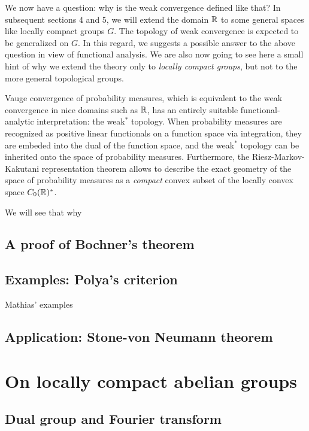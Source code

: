 \documentclass[12pt]{article}
\begin{document}
We now have a question: why is the weak convergence defined like that?
In subsequent sections 4 and 5, we will extend the domain $\mathbb{R}$ to some general spaces like locally compact groups $G$.
The topology of weak convergence is expected to be generalized on $G$.
In this regard, we suggests a possible answer to the above question in view of functional analysis.
We are also now going to see here a small hint of why we extend the theory only to \emph{locally compact groups}, but not to the more general topological groups.

Vauge convergence of probability measures, which is equivalent to the weak convergence in nice domains such as $\mathbb{R}$, has an entirely suitable functional-analytic interpretation: the weak$^*$ topology.
When probability measures are recognized as positive linear functionals on a function space via integration, they are embeded into the dual of the function space, and the weak$^*$ topology can be inherited onto the space of probability measures.
Furthermore, the Riesz-Markov-Kakutani representation theorem allows to describe the exact geometry of the space of probability measures as a \emph{compact} convex subset of the locally convex space $C_0(\mathbb{R})^*$.

We will see that why 



\subsection{A proof of Bochner's theorem}


\subsection{Examples: Polya's criterion}
Mathias' examples

\subsection{Application: Stone-von Neumann theorem}






\section{On locally compact abelian groups}

\subsection{Dual group and Fourier transform}
\end{document}
